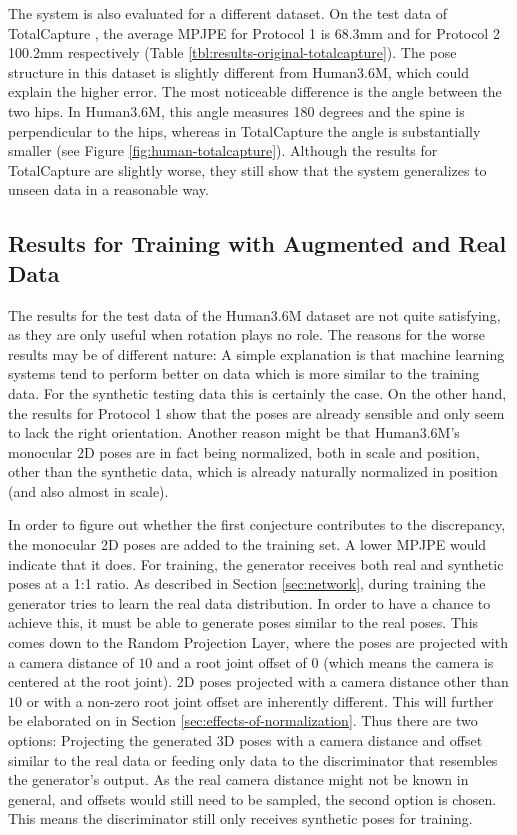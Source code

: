 The system is also evaluated for a different dataset.
On the test data of TotalCapture \cite{trumble17}, the average MPJPE for Protocol 1 is 68.3mm and for Protocol 2 100.2mm respectively (Table \ref{tbl:results-original-totalcapture}).
The pose structure in this dataset is slightly different from Human3.6M, which could explain the higher error.
The most noticeable difference is the angle between the two hips.
In Human3.6M, this angle measures 180 degrees and the spine is perpendicular to the hips, whereas in TotalCapture the angle is substantially smaller (see Figure \ref{fig:human-totalcapture}).
Although the results for TotalCapture are slightly worse, they still show that the system generalizes to unseen data in a reasonable way.




\subsection{Results for Training with Augmented and Real Data}
The results for the test data of the Human3.6M dataset are not quite satisfying, as they are only useful when rotation plays no role.
The reasons for the worse results may be of different nature:
A simple explanation is that machine learning systems tend to perform better on data which is more similar to the training data.
For the synthetic testing data this is certainly the case.
On the other hand, the results for Protocol 1 show that the poses are already sensible and only seem to lack the right orientation.
Another reason might be that Human3.6M's monocular 2D poses are in fact being normalized, both in scale and position, other than the synthetic data, which is already naturally normalized in position (and also almost in scale).

In order to figure out whether the first conjecture contributes to the discrepancy, the monocular 2D poses are added to the training set.
A lower MPJPE would indicate that it does.
For training, the generator receives both real and synthetic poses at a 1:1 ratio.
As described in Section \ref{sec:network}, during training the generator tries to learn the real data distribution.
In order to have a chance to achieve this, it must be able to generate poses similar to the real poses. 
This comes down to the Random Projection Layer, where the poses are projected with a camera distance of $10$ and a root joint offset of $0$ (which means the camera is centered at the root joint).
2D poses projected with a camera distance other than $10$ or with a non-zero root joint offset are inherently different.
This will further be elaborated on in Section \ref{sec:effects-of-normalization}.
Thus there are two options:
Projecting the generated 3D poses with a camera distance and offset similar to the real data or feeding only data to the discriminator that resembles the generator's output.
As the real camera distance might not be known in general, and offsets would still need to be sampled, the second option is chosen.
This means the discriminator still only receives synthetic poses for training.

